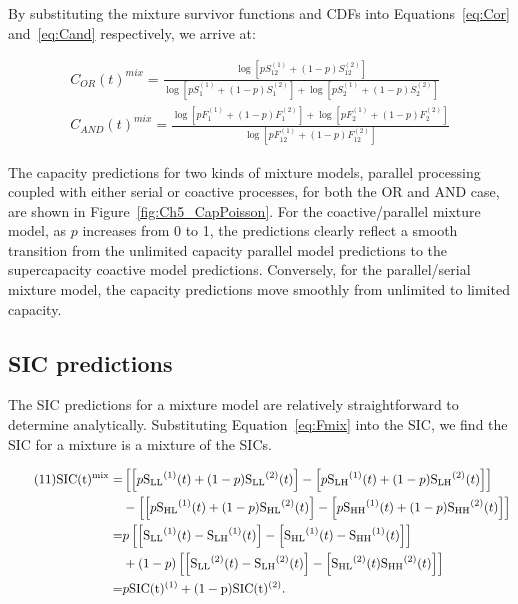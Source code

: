 By substituting the mixture survivor functions and CDFs into Equations~\ref{eq:Cor} and~\ref{eq:Cand} respectively, we arrive at:

\begin{align} \tag{10} \label{eq:CtMix}
    C_{OR}(t)^{mix} = \frac{\log\left[pS^{(1)}_{12} + (1-p)S^{(2)}_{12}\right]}{\log\left[pS^{(1)}_{1} + (1-p)S^{(2)}_{1}\right] + \log\left[pS^{(1)}_{2} + (1-p)S^{(2)}_{2}\right]}\\[15pt]
    C_{AND}(t)^{mix} = \frac{\log\left[pF^{(1)}_{1} + (1-p)F^{(2)}_{1}\right] + \log\left[pF^{(1)}_{2} + (1-p)F^{(2)}_{2}\right]}{\log\left[pF^{(1)}_{12} + (1-p)F^{(2)}_{12}\right]} \nonumber
\end{align}

The capacity predictions for two kinds of mixture models, parallel processing coupled with either serial or coactive processes, for both the OR and AND case, are shown in Figure~\ref{fig:Ch5_CapPoisson}. For the coactive/parallel mixture model, as $p$ increases from 0 to 1, the predictions clearly reflect a smooth transition from the unlimited capacity parallel model predictions to the supercapacity coactive model predictions. Conversely, for the parallel/serial mixture model, the capacity predictions move smoothly from unlimited to limited capacity. 

\subsection{SIC predictions} 
The SIC predictions for a mixture model are relatively straightforward to determine analytically.  
Substituting Equation~\ref{eq:Fmix} into the SIC, we find the SIC for a mixture is a mixture of the SICs.

\begin{align*} \tag{11} \label{eq:SICmix}
    \rm{SIC}(t)^{mix} =& \left[\left[p{\rm S_{LL}}^{(1)}(t)+(1-p){\rm S_{LL}}^{(2)}(t)\right]-\left[p{\rm S_{LH}}^{(1)}(t)+(1-p){\rm S_{LH}}^{(2)}(t)\right]\right] \\
    &-\left[\left[p{\rm S_{HL}}^{(1)}(t)+(1-p){\rm S_{HL}}^{(2)}(t)\right]-\left[p{\rm S_{HH}}^{(1)}(t)+(1-p){\rm S_{HH}}^{(2)}(t)\right]\right]\\
    =&  p\left[\left[{\rm S_{LL}}^{(1)}(t)-{\rm S_{LH}}^{(1)}(t)\right] -  \left[{\rm S_{HL}}^{(1)}(t)-{\rm S_{HH}}^{(1)}(t)\right]\right] \\
    &+ (1-p)\left[\left[{\rm S_{LL}}^{(2)}(t)-{\rm S_{LH}}^{(2)}(t)\right] - \left[{\rm S_{HL}}^{(2)}(t){\rm S_{HH}}^{(2)}(t)\right]\right] \\
    =& p\rm{SIC}(t)^{(1)}  + (1-p)\rm{SIC}(t)^{(2)}.
\end{align*}
